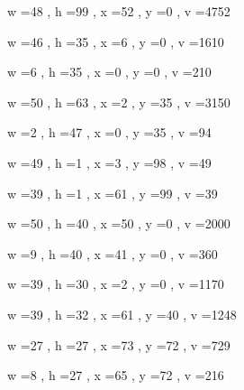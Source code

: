\documentclass[11pt]{article}
\begin{document}
w =48 , h =99 , x =52 , y =0 , v =4752
\par
w =46 , h =35 , x =6 , y =0 , v =1610
\par
w =6 , h =35 , x =0 , y =0 , v =210
\par
w =50 , h =63 , x =2 , y =35 , v =3150
\par
w =2 , h =47 , x =0 , y =35 , v =94
\par
w =49 , h =1 , x =3 , y =98 , v =49
\par
w =39 , h =1 , x =61 , y =99 , v =39
\par
\newpage




w =50 , h =40 , x =50 , y =0 , v =2000
\par
w =9 , h =40 , x =41 , y =0 , v =360
\par
w =39 , h =30 , x =2 , y =0 , v =1170
\par
w =39 , h =32 , x =61 , y =40 , v =1248
\par
w =27 , h =27 , x =73 , y =72 , v =729
\par
w =8 , h =27 , x =65 , y =72 , v =216
\par
\newpage
\end{document}
